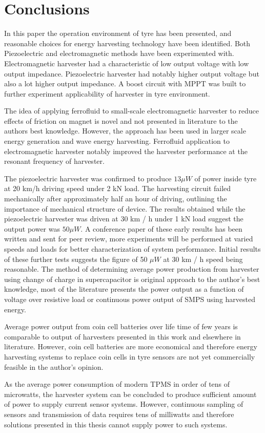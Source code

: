 \section{Conclusions}\label{sect:conclusions}
In this paper the operation environment of tyre has been presented, and reasonable choices for energy harvesting technology have been identified. Both Piezoelectric and electromagnetic methods have been experimented with. Electromagnetic harvester had a characteristic of low output voltage with low output impedance. Piezoelectric harvester had notably higher output voltage but also a lot higher output impedance. A boost circuit with MPPT was built to further experiment applicability of harvester in tyre environment. 

The idea of applying ferrofluid to small-scale electromagnetic harvester to reduce effects of friction on magnet is novel and not presented in literature to the authors best knowledge. However, the approach has been used in larger scale energy generation and wave energy harvesting. Ferrofluid application to electromagnetic harvester notably improved the harvester performance at the resonant frequency of harvester. 

The piezoelectric harvester was confirmed to produce $13 \mu W$ of power inside tyre at 20 km/h driving speed under 2 kN load. The harvesting circuit failed mechanically after approximately half an hour of driving, outlining the importance of mechanical structure of device. The results obtained while the piezoelectric harvester was driven at 30 km / h under 1 kN load suggest the output power was $50 \mu W$. A conference paper of these early results has been written and sent for peer review, more experiments will be performed at varied speeds and loads for better characterization of system performance. Initial results of these further tests suggests the figure of 50 $\mu W$ at 30 km / h speed being reasonable. The method of determining average power production from harvester using change of charge in supercapacitor is original approach to the author's best knowledge, most of the literature presents the power output as a function of voltage over resistive load or continuous power output of SMPS using harvested energy.  

Average power output from coin cell batteries over life time of few years is comparable to output of harvesters presented in this work and elsewhere in literature. However, coin cell batteries are more economical and therefore energy harvesting systems to replace coin cells in tyre sensors are not yet commercially feasible in the author's opinion.

As the average power consumption of modern TPMS in order of tens of microwatts, the harvester system can be concluded to produce sufficient amount of power to supply current sensor systems. However, continuous sampling of sensors and transmission of data requires tens of milliwatts and therefore solutions presented in this thesis cannot supply power to such systems. 
